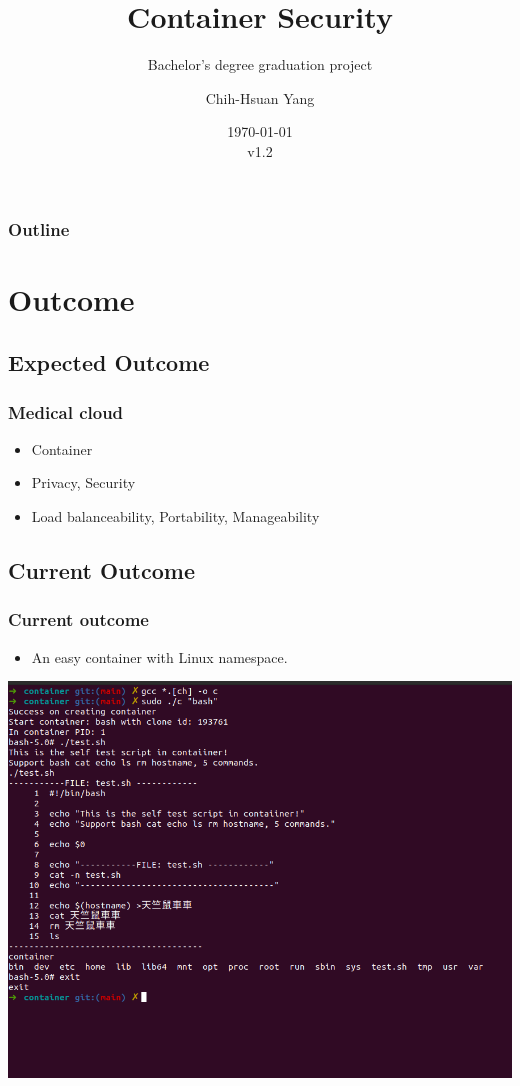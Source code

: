 \documentclass{beamer}
\title{Container Security}
\subtitle{Bachelor's degree graduation project}
\author{Chih-Hsuan Yang}
\institute{National Sun Yat-sen University}
\date{\today\\v1.2}
\begin{document}
\begin{frame}
    \titlepage
\end{frame}

\begin{frame}
    \frametitle{Outline}
    \tableofcontents
\end{frame}

\section{Outcome}
\subsection{Expected Outcome}
\begin{frame}
    \frametitle{Medical cloud}
    \begin{itemize}
        \item Container
        \item Privacy, Security
        \item Load balanceability, Portability, Manageability
    \end{itemize}
\end{frame}

\subsection{Current Outcome}
\begin{frame}
    \frametitle{Current outcome}
    \begin{itemize}
        \item An easy container with Linux namespace.
    \end{itemize}
    \centering\includegraphics[width=1.0\textwidth]{cur_cont.png}
\end{frame}
\end{document}
